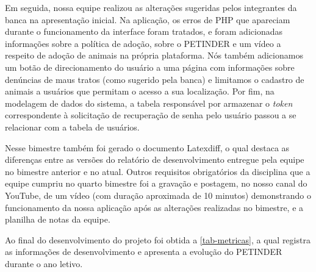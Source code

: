 Em seguida, nossa equipe realizou as alterações sugeridas pelos integrantes da banca na apresentação inicial. Na aplicação, os erros de \ac{PHP} que apareciam durante o funcionamento da interface foram tratados, e foram adicionadas informações sobre a política de adoção, sobre o PETINDER e um vídeo a respeito de adoção de animais na própria plataforma. Nós também adicionamos um botão de direcionamento do usuário a uma página com informações sobre denúncias de maus tratos (como sugerido pela banca) e limitamos o cadastro de animais a usuários que permitam o acesso a sua localização. Por fim, na modelagem de dados do sistema, a tabela responsável por armazenar o \textit{token} correspondente à solicitação de recuperação de senha pelo usuário passou a se relacionar com a tabela de usuários.

Nesse bimestre também foi gerado o documento \gls{Latexdiff}, o qual destaca as diferenças entre as versões do relatório de desenvolvimento entregue pela equipe no bimestre anterior e no atual. Outros requisitos obrigatórios da disciplina que a equipe cumpriu no quarto bimestre foi a gravação e postagem, no nosso canal do \gls{YouTube}, de um vídeo (com duração aproximada de 10 minutos) demonstrando o funcionamento da nossa aplicação após as alterações realizadas no bimestre, e a planilha de notas da equipe.

Ao final do desenvolvimento do projeto foi obtida a \autoref{tab-metricas}, a qual registra as informações de desenvolvimento e apresenta a evolução do PETINDER durante o ano letivo.

